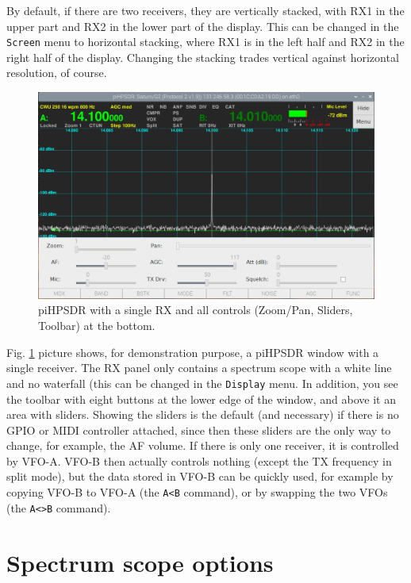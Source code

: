 \documentclass[12pt]{book}
\def\bltt#1{\texttt{\color{blue}#1}}
\begin{document}
 By default, if there are two receivers, they are vertically stacked,
 with RX1 in the upper part and RX2 in the lower part of the display.
 This can be changed in the \bltt{Screen} menu to horizontal stacking,
 where RX1 is  in the left half and RX2 in the right half of  the 
 display. Changing the stacking trades vertical against horizontal
 resolution, of course.
 
  
\begin{figure}[h]
\center
\includegraphics[width=12cm]{SingleReceiver.png}
\caption{piHPSDR with a single RX and all controls (Zoom/Pan,
Sliders, Toolbar) at the  bottom.}
\label{fig:SingleReceiver}
\end{figure}

 Fig. \ref{fig:SingleReceiver} picture shows, for demonstration purpose, a piHPSDR
 window with a single receiver. 
 The RX panel only contains a
 spectrum scope with a white line and no waterfall (this can be changed in the
 \bltt{Display} menu. In addition, you see the toolbar
 with eight buttons at the lower edge of the window, and above
 it an area with sliders. Showing the sliders is the default
 (and necessary) if there is no GPIO or MIDI controller attached,
 since then these sliders are the only way to change, for example,
 the AF volume. If there is only one receiver, it is controlled
 by VFO-A. VFO-B then actually controls nothing (except the TX
 frequency in split mode), but the data stored in VFO-B can
 be quickly used, for example by copying VFO-B to VFO-A (the
 \bltt{A<B} command), or by swapping the two VFOs (the
 \bltt{A<>B} command).

\section{Spectrum scope options}
\label{sec:FillingGradient}
\end{document}
